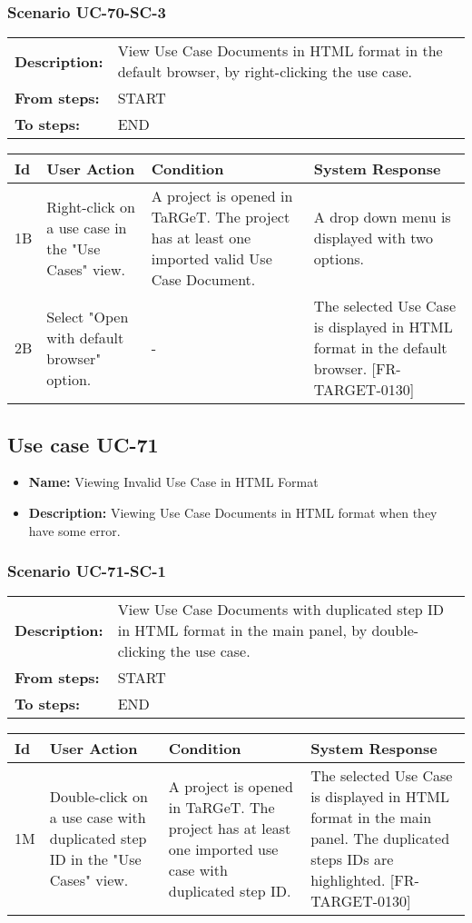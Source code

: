 \documentclass[a4paper,11pt]{article}
\newcommand{\bl}{\\ \hline}
\begin{document}
\subsubsection*{Scenario UC-70-SC-3}
\begin{tabular}{p{1in}p{4in}}
{\bf Description:} & View Use Case Documents in HTML format in the default browser, by right-clicking the use case. \\
{\bf From steps:} & START \\
{\bf To steps:} & END \\
\end{tabular}
 
\begin{tabular}{|p{0.8in}|p{1.6in}|p{1.6in}|p{1.6in}|}
\hline
Id & User Action & Condition & System Response  \bl 
1B & Right-click on a use case in the "Use Cases" view. & A project is opened in TaRGeT. The project has at least one imported valid Use Case Document. & A drop down menu is displayed with two options. \bl 
2B & Select "Open with default browser" option. & - & The selected Use Case is displayed in HTML format in the default browser. [FR-TARGET-0130] \bl 
\end{tabular}
\subsection*{Use case UC-71}
\begin{itemize}
\item {\bf Name: }Viewing Invalid Use Case in HTML Format
\item {\bf Description: }Viewing Use Case Documents in HTML format when they have some error.
\end{itemize}
\subsubsection*{Scenario UC-71-SC-1}
\begin{tabular}{p{1in}p{4in}}
{\bf Description:} & View Use Case Documents with duplicated step ID in HTML format in the main panel, by double-clicking the use case. \\
{\bf From steps:} & START \\
{\bf To steps:} & END \\
\end{tabular}
 
\begin{tabular}{|p{0.8in}|p{1.6in}|p{1.6in}|p{1.6in}|}
\hline
Id & User Action & Condition & System Response  \bl 
1M & Double-click on a use case with duplicated step ID in the "Use Cases" view. & A project is opened in TaRGeT. The project has at least one imported use case with duplicated step ID. & The selected Use Case is displayed in HTML format in the main panel. The duplicated steps IDs are highlighted.   [FR-TARGET-0130] \bl 
\end{tabular}
\end{document}
